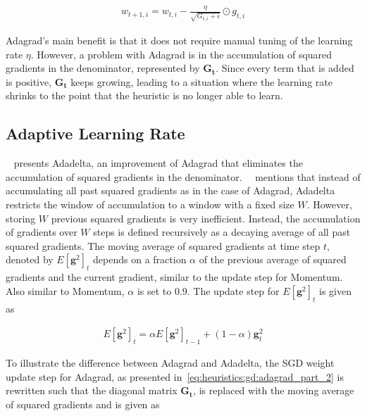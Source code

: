 \begin{equation}
	\label{eq:heuristics:gd:adagrad_part_2}
	\begin{split}
		w_{t+1,i} = w_{t,i} - \frac{\eta}{\sqrt{G_{t,i} + \epsilon}} \odot g_{t,i}
	\end{split}
\end{equation}

\Ac{Adagrad}'s main benefit is that it does not require manual tuning of the learning rate $\eta$. However, a problem with \acs{Adagrad} is in the accumulation of squared gradients in the denominator, represented by $\boldsymbol{G_{t}}$. Since every term that is added is positive, $\boldsymbol{G_{t}}$ keeps growing, leading to a situation where the learning rate shrinks to the point that the heuristic is no longer able to learn.

\subsection{Adaptive Learning Rate}\label{sec:heuristics:adadelta}

\citeauthor{ref:zeiler:2012}~\cite{ref:zeiler:2012} presents \acs{Adadelta}, an improvement of \acs{Adagrad} that eliminates the accumulation of squared gradients in the denominator.~\citeauthor{ref:ruder:2016}~\cite{ref:ruder:2016} mentions that instead of accumulating all past squared gradients as in the case of \acs{Adagrad}, \acs{Adadelta} restricts the window of accumulation to a window with a fixed size $W$. However, storing $W$ previous squared gradients is very inefficient. Instead, the accumulation of gradients over $W$ steps is defined recursively as a decaying average of all past squared gradients. The moving average of squared gradients at time step $t$, denoted by $E[\boldsymbol{g}^{2}]_{t}$  depends on a fraction $\alpha$ of the previous average of squared gradients and the current gradient, similar to the update step for \acs{Momentum}. Also similar to \acs{Momentum}, $\alpha$ is set to 0.9. The update step for $E[\boldsymbol{g}^{2}]_{t}$ is given as

\begin{equation}
	\label{eq:heuristics:gd:adadelta_part_1}
	\begin{split}
		E[\boldsymbol{g}^{2}]_{t} = \alpha E[\boldsymbol{g}^{2}]_{t - 1} + (1 - \alpha)\boldsymbol{g}_{t}^{2}
	\end{split}
\end{equation}

To illustrate the difference between \acs{Adagrad} and \acs{Adadelta}, the \acs{SGD} weight update step for \acs{Adagrad}, as presented in~\eqref{eq:heuristics:gd:adagrad_part_2} is rewritten such that the diagonal matrix $\boldsymbol{G_{t}}$, is replaced with the moving average of squared gradients and is given as

